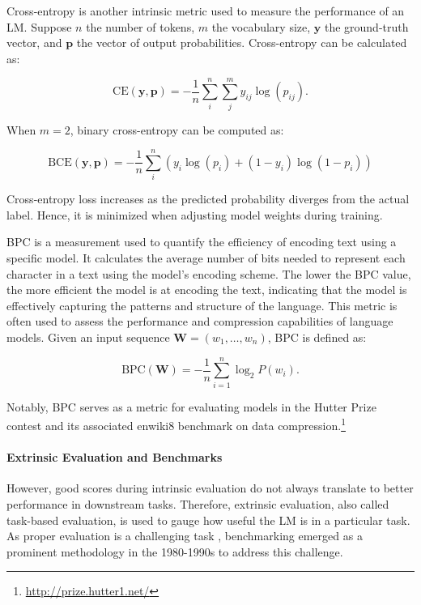 Cross-entropy is another intrinsic metric used to measure the performance of an \ac{LM}. Suppose $n$ the number of tokens, $m$ the vocabulary size, $\bm{y}$ the ground-truth vector, and $\bm{p}$ the vector of output probabilities. Cross-entropy can be calculated as:

\begin{equation}
    \text{CE}(\bm{y}, \bm{p}) = - \dfrac{1}{n} \sum_{i}^n \sum_{j}^m y_{ij} \log (p_{ij}).
\end{equation}

\noindent When $m = 2$, binary cross-entropy can be computed as:

\begin{equation}
    \text{BCE}(\bm{y}, \bm{p}) = - \dfrac{1}{n} \sum_{i}^n (y_i \log(p_i) + (1-y_i) \log (1-p_i))
\end{equation}

\noindent Cross-entropy loss increases as the predicted probability diverges from the actual label. Hence, it is minimized when adjusting model weights during training. 

\ac{BPC} is a measurement used to quantify the efficiency of encoding text using a specific model. It calculates the average number of bits needed to represent each character in a text using the model's encoding scheme. The lower the \ac{BPC} value, the more efficient the model is at encoding the text, indicating that the model is effectively capturing the patterns and structure of the language. This metric is often used to assess the performance and compression capabilities of language models. Given an input sequence $\bm{W} = (w_1, \ldots, w_n)$, \ac{BPC} is defined as:

\begin{equation}
    \text{BPC}(\bm{W}) = - \dfrac{1}{n} \sum_{i=1}^n \log_2 P(w_i).
\end{equation}

\noindent Notably, \ac{BPC} serves as a metric for evaluating models in the Hutter Prize contest and its associated enwiki8 benchmark on data compression.\footnote{\url{http://prize.hutter1.net/}}

\paragraph{Extrinsic Evaluation and Benchmarks} However, good scores during intrinsic evaluation do not always translate to better performance in downstream tasks. Therefore, extrinsic evaluation, also called task-based evaluation, is used to gauge how useful the \ac{LM} is in a particular task. As proper evaluation is a challenging task \citep{jones2005some}, benchmarking emerged as a prominent methodology in the 1980-1990s to address this challenge. 

